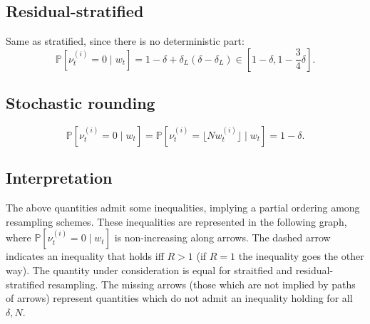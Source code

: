 \documentclass[fleqn]{article}
\newcommand{\Prob}{\mathbb{P}}
\newcommand{\1}[1]{\mathbb{I}_{#1}}
\newcommand{\flnw}[1][i]{\lfloor N w_t^{(#1)} \rfloor}
\begin{document}
\subsection*{Residual-stratified}
Same as stratified, since there is no deterministic part:
\begin{equation*}
\Prob[ \nu_t^{(i)} =0 \mid w_t ]
= 1 - \delta + \delta_L (\delta - \delta_L)
\in \left[ 1-\delta, 1- \frac{3}{4}\delta \right] .
\end{equation*}

\subsection*{Stochastic rounding}
\begin{equation*}
\Prob[ \nu_t^{(i)} =0 \mid w_t ]
= \Prob[ \nu_t^{(i)} = \flnw \mid w_t ]
= 1 - \delta .
\end{equation*}

\subsection{Interpretation}
The above quantities admit some inequalities, implying a partial ordering among resampling schemes. These inequalities are represented in the following graph, where $\Prob[ \nu_t^{(i)} =0 \mid w_t ]$ is non-increasing along arrows. The dashed arrow indicates an inequality that holds iff $R>1$ (if $R=1$ the inequality goes the other way). The quantity under consideration is equal for straitfied and residual-stratified resampling. The missing arrows (those which are not implied by paths of arrows) represent quantities which do not admit an inequality holding for all $\delta, N$.\\

\end{document}
